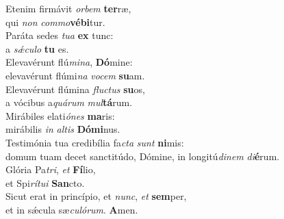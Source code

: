 \evenverse Etenim firmávit \textit{or}\textit{bem} \textbf{ter}ræ,~\*\\
\evenverse qui \textit{non} \textit{com}\textit{mo}\textbf{vé}\textbf{bi}tur.\\
\oddverse Paráta sedes \textit{tu}\textit{a} \textbf{ex} tunc:~\*\\
\oddverse a \textit{sǽ}\textit{cu}\textit{lo} \textbf{tu} es.\\
\evenverse Elevavérunt flú\textit{mi}\textit{na}, \textbf{Dó}mine:~\*\\
\evenverse elevavérunt flúmi\textit{na} \textit{vo}\textit{cem} \textbf{su}am.\\
\oddverse Elevavérunt flúmina \textit{flu}\textit{ctus} \textbf{su}os,~\*\\
\oddverse a vócibus a\textit{quá}\textit{rum} \textit{mul}\textbf{tá}rum.\\
\evenverse Mirábiles elati\textit{ó}\textit{nes} \textbf{ma}ris:~\*\\
\evenverse mirábilis \textit{in} \textit{al}\textit{tis} \textbf{Dó}\textbf{mi}nus.\\
\oddverse Testimónia tua credibília fa\textit{cta} \textit{sunt} \textbf{ni}mis:~\*\\
\oddverse domum tuam decet sanctitúdo, Dómine, in longitú\textit{di}\textit{nem} \textit{di}\textbf{é}rum.\\
\evenverse Glória Pa\textit{tri}, \textit{et} \textbf{Fí}lio,~\*\\
\evenverse et Spi\textit{rí}\textit{tu}\textit{i} \textbf{San}cto.\\
\oddverse Sicut erat in princípio, et \textit{nunc}, \textit{et} \textbf{sem}per,~\*\\
\oddverse et in sǽcula sæ\textit{cu}\textit{ló}\textit{rum}. \textbf{A}men.\\
